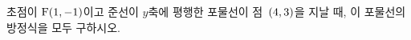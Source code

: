 초점이 $\mathrm{F}(1{,}\mkern3mu\mathopen{}-1)$이고 준선이 $y$축에 평행한 포물선이 점~$(4{,}\mkern3mu\mathopen{}3)$을 지날 때, 이 포물선의 방정식을 모두 구하시오.
